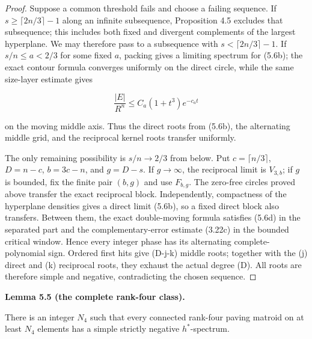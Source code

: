 \documentclass[10pt]{article}
\newenvironment{mdstatement}[1]
  {\par\Needspace{0.16\textheight}\noindent\textbf{#1.}\ \itshape}
  {\par\normalfont}
\begin{document}
\begin{proof}
Suppose a common threshold fails and choose a failing sequence.  If
$s\ge\lceil2n/3\rceil-1$ along an infinite subsequence, Proposition 4.5
excludes that subsequence; this includes both fixed and divergent complements
of the largest hyperplane.  We may therefore pass to a subsequence with
$s<\lceil2n/3\rceil-1$.  If $s/n\le a<2/3$ for some fixed $a$, packing
gives a limiting spectrum for (5.6b); the exact contour formula converges
uniformly on the direct circle, while the same size-layer estimate gives

\[
 \frac{|E|}{R^n}\le C_a(1+t^3)e^{-c_at} \tag{5.6d}
\]

on the moving middle axis.  Thus the direct roots from (5.6b), the alternating
middle grid, and the reciprocal kernel roots transfer uniformly.

The only remaining possibility is $s/n\to2/3$ from below.  Put
$c=\lceil n/3\rceil$, $D=n-c$, $b=3c-n$, and $g=D-s$.
If $g\to\infty$, the reciprocal limit is $V_{3,b}$; if $g$ is bounded,
fix the finite pair $(b,g)$ and use $F_{b,g}$.  The zero-free circles proved
above transfer the exact reciprocal block.  Independently, compactness of the
hyperplane densities gives a direct limit (5.6b), so a fixed direct block also
transfers.  Between them, the exact double-moving formula satisfies (5.6d) in
the separated part and the complementary-error estimate (3.22c) in the
bounded critical window.  Hence every integer phase has its alternating
complete-polynomial sign.  Ordered first hits give (D-j-k) middle roots;
together with the (j) direct and (k) reciprocal roots, they exhaust the
actual degree (D).  All roots are therefore simple and negative, contradicting
the chosen sequence.
\end{proof}


\begin{mdstatement}{Lemma 5.5 (the complete rank-four class)}


There is an integer $N_4$ such that every connected rank-four paving
matroid on at least $N_4$ elements has a simple strictly negative
$h^*$-spectrum.

\end{mdstatement}
\end{document}
